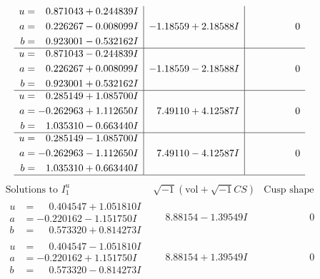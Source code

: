 \documentclass[1p]{elsarticle_modified}
\theoremstyle{definition}
\newcommand{\I}{\sqrt{-1}}
\begin{document}
$$\begin{array}{c|c|c}
\begin{aligned}
u &= \phantom{-}0.871043 + 0.244839 I \\
a &= \phantom{-}0.226267 - 0.008099 I \\
b &= \phantom{-}0.923001 - 0.532162 I\end{aligned}
 & -1.18559 + 2.18588 I & \phantom{-0.000000 } 0 \\ \hline\begin{aligned}
u &= \phantom{-}0.871043 - 0.244839 I \\
a &= \phantom{-}0.226267 + 0.008099 I \\
b &= \phantom{-}0.923001 + 0.532162 I\end{aligned}
 & -1.18559 - 2.18588 I & \phantom{-0.000000 } 0 \\ \hline\begin{aligned}
u &= \phantom{-}0.285149 + 1.085700 I \\
a &= -0.262963 + 1.112650 I \\
b &= \phantom{-}1.035310 - 0.663440 I\end{aligned}
 & \phantom{-}7.49110 + 4.12587 I & \phantom{-0.000000 } 0 \\ \hline\begin{aligned}
u &= \phantom{-}0.285149 - 1.085700 I \\
a &= -0.262963 - 1.112650 I \\
b &= \phantom{-}1.035310 + 0.663440 I\end{aligned}
 & \phantom{-}7.49110 - 4.12587 I & \phantom{-0.000000 } 0\\
 \hline 
 \end{array}$$\newpage$$\begin{array}{c|c|c}  
\text{Solutions to }I^u_{1}& \I (\text{vol} + \sqrt{-1}CS) & \text{Cusp shape}\\
 \hline 
\begin{aligned}
u &= \phantom{-}0.404547 + 1.051810 I \\
a &= -0.220162 - 1.151750 I \\
b &= \phantom{-}0.573320 + 0.814273 I\end{aligned}
 & \phantom{-}8.88154 - 1.39549 I & \phantom{-0.000000 } 0 \\ \hline\begin{aligned}
u &= \phantom{-}0.404547 - 1.051810 I \\
a &= -0.220162 + 1.151750 I \\
b &= \phantom{-}0.573320 - 0.814273 I\end{aligned}
 & \phantom{-}8.88154 + 1.39549 I & \phantom{-0.000000 } 0 \\ \hline\begin{aligned}

\end{aligned}
\end{array}$$
\end{document}
